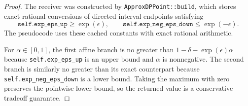 \documentclass{article}
\begin{document}
\begin{proof}
The receiver was constructed by \texttt{ApproxDPPoint::build}, which stores
exact rational conversions of directed interval endpoints satisfying
\[
    \texttt{self.exp\_eps\_up} \ge \exp(\epsilon), \qquad
    \texttt{self.exp\_neg\_eps\_down} \le \exp(-\epsilon).
\]
The pseudocode uses these cached constants with exact rational arithmetic.

For $\alpha \in [0,1]$, the first affine branch is no greater than
$1 - \delta - \exp(\epsilon)\alpha$ because \texttt{self.exp\_eps\_up} is an
upper bound and $\alpha$ is nonnegative. The second branch is similarly no
greater than its exact counterpart because \texttt{self.exp\_neg\_eps\_down}
is a lower bound. Taking the maximum with zero preserves the pointwise lower
bound, so the returned value is a conservative tradeoff guarantee.
\end{proof}
\end{document}
